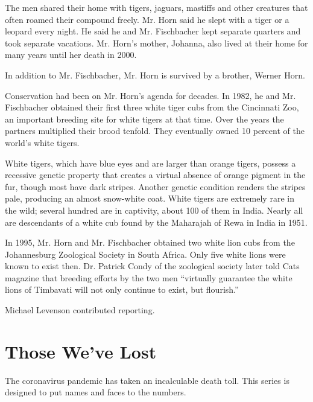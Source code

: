 The men shared their home with tigers, jaguars, mastiffs and other
creatures that often roamed their compound freely. Mr. Horn said he
slept with a tiger or a leopard every night. He said he and Mr.
Fischbacher kept separate quarters and took separate vacations. Mr.
Horn's mother, Johanna, also lived at their home for many years until
her death in 2000.

In addition to Mr. Fischbacher, Mr. Horn is survived by a brother,
Werner Horn.

Conservation had been on Mr. Horn's agenda for decades. In 1982, he and
Mr. Fischbacher obtained their first three white tiger cubs from the
Cincinnati Zoo, an important breeding site for white tigers at that
time. Over the years the partners multiplied their brood tenfold. They
eventually owned 10 percent of the world's white tigers.

White tigers, which have blue eyes and are larger than orange tigers,
possess a recessive genetic property that creates a virtual absence of
orange pigment in the fur, though most have dark stripes. Another
genetic condition renders the stripes pale, producing an almost
snow-white coat. White tigers are extremely rare in the wild; several
hundred are in captivity, about 100 of them in India. Nearly all are
descendants of a white cub found by the Maharajah of Rewa in India in
1951.

In 1995, Mr. Horn and Mr. Fischbacher obtained two white lion cubs from
the Johannesburg Zoological Society in South Africa. Only five white
lions were known to exist then. Dr. Patrick Condy of the zoological
society later told Cats magazine that breeding efforts by the two men
``virtually guarantee the white lions of Timbavati will not only
continue to exist, but flourish.''

Michael Levenson contributed reporting.

\href{https://www.nytimes3xbfgragh.onion/interactive/2020/obituaries/people-died-coronavirus-obituaries.html?action=click\&pgtype=Article\&state=default\&region=BELOW_MAIN_CONTENT\&context=covid_obits_promo}{}

\hypertarget{those-weve-lost}{%
\section{Those We've Lost}\label{those-weve-lost}}

The coronavirus pandemic has taken an incalculable death toll. This
series is designed to put names and faces to the numbers.

